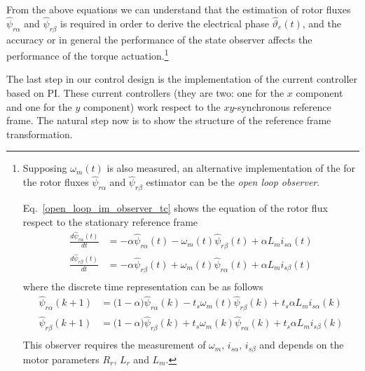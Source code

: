 \documentclass[12pt,a4paper,oneside]{book}
\begin{document}
\begin{onehalfspace}
From the above equations we can understand that the estimation of rotor fluxes 
$\hat{\psi}_{r\alpha}$ and $\hat{\psi}_{r\beta}$ is required in order to derive 
the electrical phase $\hat{\vartheta}_{e}(t)$, and the accuracy or in general 
the performance of the state observer affects the performance of the torque 
actuation.\footnote{
	Supposing $\omega_m(t)$ is also measured, an alternative implementation of the  
	for the rotor fluxes $\hat{\psi}_{r\alpha}$ and 
	$\hat{\psi}_{r\beta}$ estimator can be the \textit{open loop observer}. 
	
	Eq.~\eqref{open_loop_im_observer_tc} shows the equation of the rotor flux 
	respect to the stationary reference frame
	\begin{equation}\label{open_loop_im_observer_tc}
		\begin{aligned}
			\frac{d\hat{\psi}_{r\alpha}(t)}{dt} &= -\alpha \hat{\psi}_{r\alpha}(t) 
			-\omega_m(t)\hat{\psi}_{r\beta}(t) + \alpha L_m i_{s\alpha}(t) \\[6pt]
			\frac{d\hat{\psi}_{r\beta}(t)}{dt} &= -\alpha \hat{\psi}_{r\beta}(t) 
			+\omega_m(t)\hat{\psi}_{r\alpha}(t) + \alpha L_m i_{s\beta}(t) \\[6pt]
		\end{aligned}
	\end{equation}
	where the discrete time representation can be as follows
	\begin{equation}\label{open_loop_im_observer_td}
		\begin{aligned}
			\hat{\psi}_{r\alpha}(k+1) &= \Big(1-\alpha\Big) \hat{\psi}_{r\alpha}(k) 
			-t_s\omega_m(t)\hat{\psi}_{r\beta}(k) + t_s\alpha L_m i_{s\alpha}(k) \\[6pt]
			\hat{\psi}_{r\beta}(k+1) &= \Big(1-\alpha\Big) \hat{\psi}_{r\beta}(k) 
			+t_s\omega_m(k)\hat{\psi}_{r\alpha}(k) + t_s\alpha L_m i_{s\beta}(k) \\[6pt]
		\end{aligned}
	\end{equation}
	This observer requires the measurement of $\omega_m,\, i_{s\alpha},\, 
	i_{s\beta}$ and depends on the motor parameters $R_r$, $L_r$ and $L_m$.}

The last step in our control design is the implementation of the current controller based on PI. These current controllers (they are two: one for the $x$ component and one for the $y$ component) work respect to the $xy$-synchronous reference frame. The natural step now is to show the structure of the reference frame transformation.


\end{onehalfspace}
\end{document}
